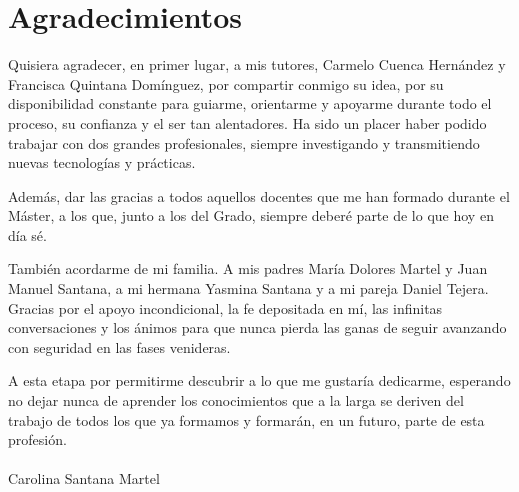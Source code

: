 \chapter*{Agradecimientos}

Quisiera agradecer, en primer lugar, a mis tutores, Carmelo Cuenca Hernández y Francisca Quintana Domínguez, por compartir conmigo su idea, por su disponibilidad constante para guiarme, orientarme y apoyarme durante todo el proceso, su confianza y el ser tan alentadores. Ha sido un placer haber podido trabajar con dos grandes profesionales, siempre investigando y transmitiendo nuevas tecnologías y prácticas.  

Además, dar las gracias a todos aquellos docentes que me han formado durante el Máster, a los que, junto a los del Grado, siempre deberé parte de lo que hoy en día sé.

También acordarme de mi familia. A mis padres María Dolores Martel y Juan Manuel Santana, a mi hermana Yasmina Santana y a mi pareja Daniel Tejera. Gracias por el apoyo incondicional, la fe depositada en mí, las infinitas conversaciones y los ánimos para que nunca pierda las ganas de seguir avanzando con seguridad en las fases venideras.

A esta etapa por permitirme descubrir a lo que me gustaría dedicarme, esperando no dejar nunca de aprender los conocimientos que a la larga se deriven del trabajo de todos los que ya formamos y formarán, en un futuro, parte de esta profesión.
\\
\\
Carolina Santana Martel